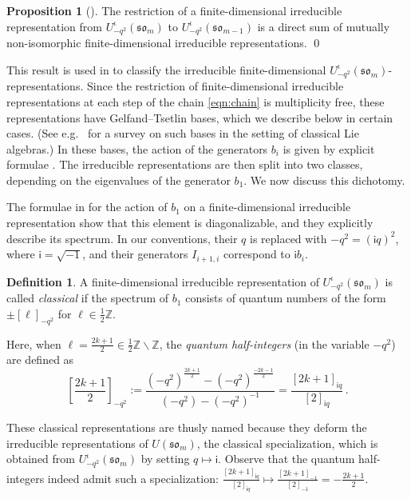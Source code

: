 \documentclass[10pt]{amsart}
\numberwithin{equation}{section}
\theoremstyle{definition}
\newtheorem{prop}[thm]{Proposition}
\newtheorem{defn}[thm]{Definition}
\def\Z{{\mathbb Z}}
\newcommand{\som}[1][m]{\mathfrak{so}_{#1}}
\newcommand{\iqUsom}[1][m]{{U}^{\iota}_{-q^2}(\som[#1])}
\begin{document}
\begin{prop}[{\cite[Theorem 1]{MR2143754}}]\label{prop:mult-free}
The restriction of a finite-dimensional irreducible representation from $\iqUsom$ to $\iqUsom[m-1]$ 
is a direct sum of mutually non-isomorphic finite-dimensional irreducible representations. \qed
\end{prop}

This result is used in \cite{MR2143754} to classify the irreducible finite-dimensional $\iqUsom$-representations.
Since the restriction of finite-dimensional irreducible representations at each step of the chain \eqref{eqn:chain} is multiplicity free, 
these representations have Gelfand--Tsetlin bases, which we describe below in certain cases.
(See e.g.~\cite{Molev} for a survey on such bases in the setting of classical Lie algebras.) 
In these bases, the action of the generators $b_i$ is given by explicit formulae \cite[Section 3]{MR2143754}. 
The irreducible representations are then split into two classes, depending on the eigenvalues of the generator $b_1$.
We now discuss this dichotomy.

The formulae in \cite[equations (9), (12), (15), and (16)]{MR2143754}
for the action of $b_1$ on a finite-dimensional irreducible representation 
show that this element is diagonalizable, and they explicitly describe its spectrum.
In our conventions, their $q$ is replaced with $-q^2=(\mathsf{i}q)^2$, where $\mathsf{i}=\sqrt{-1}$, 
and their generators $I_{i+1,i}$ correspond to $\mathsf{i} b_i$.

\begin{defn}\label{defn:classical}
A finite-dimensional irreducible representation of $\iqUsom$ is called \emph{classical} 
if the spectrum of $b_1$ consists of quantum numbers of the form
$\pm [\ell]_{-q^2}$ for  $\ell \in \tfrac{1}{2}\mathbb{Z}$. 

Here, when $\ell = \frac{2k+1}{2} \in \tfrac{1}{2}\mathbb{Z} \smallsetminus \Z$, 
the \emph{quantum half-integers} (in the variable $-q^2$) are defined as
\begin{equation}\label{eq:qhi}
\left[\frac{2k+1}{2}\right]_{-q^2} := \frac{(-q^2)^{\frac{2k+1}{2}} - (-q^2)^{\frac{-2k-1}{2}}}{(-q^2)-(-q^2)^{-1}} 
	= \frac{[2k+1]_{\mathsf{i}q}}{[2]_{\mathsf{i}q}} \, .
\end{equation}
\end{defn}

These classical representations are thusly named because they deform the irreducible representations of $U(\som)$, 
the classical specialization, which is obtained from $\iqUsom$ by setting $q \mapsto \mathsf{i}$.
Observe that the quantum half-integers indeed admit such a specialization:
$\frac{[2k+1]_{\mathsf{i}q}}{[2]_{\mathsf{i}q}} \mapsto \frac{[2k+1]_{-1}}{[2]_{-1}}=  -\frac{2k+1}{2}$.
\end{document}
